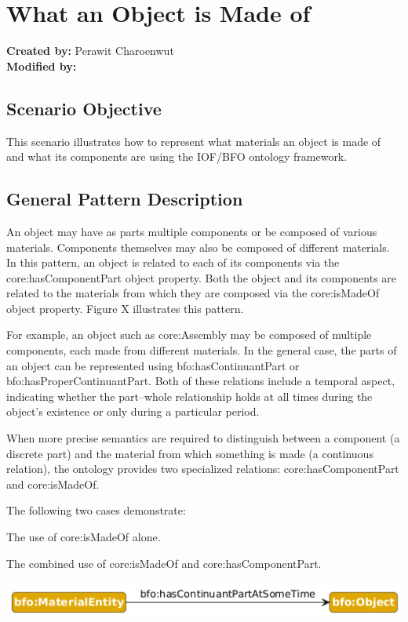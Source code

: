\section{What an Object is Made of}
\label{chapter-scenario-template}

\textbf{Created by:} Perawit Charoenwut \\
\textbf{Modified by:}

\subsection*{Scenario Objective}
This scenario illustrates how to represent what materials an object is made of and what its components are using the IOF/BFO ontology framework.

\subsection*{General Pattern Description}
An object may have as parts multiple components or be composed of various materials. Components themselves may also be composed of different materials. In this pattern, an object is related to each of its components via the core:hasComponentPart object property. Both the object and its components are related to the materials from which they are composed via the core:isMadeOf object property. Figure X illustrates this pattern.

For example, an object such as core:Assembly may be composed of multiple components, each made from different materials. In the general case, the parts of an object can be represented using bfo:hasContinuantPart or bfo:hasProperContinuantPart. Both of these relations include a temporal aspect, indicating whether the part–whole relationship holds at all times during the object’s existence or only during a particular period.

When more precise semantics are required to distinguish between a component (a discrete part) and the material from which something is made (a continuous relation), the ontology provides two specialized relations: core:hasComponentPart and core:isMadeOf.

The following two cases demonstrate:

The use of core:isMadeOf alone.

The combined use of core:isMadeOf and core:hasComponentPart.

\includegraphics[scale=0.5]{scenarios/object-artifact-material/image/what-is-made-of-schema.png}




